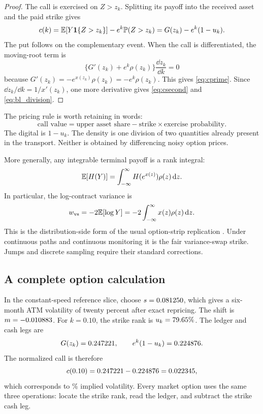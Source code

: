 \begin{proof}
The call is exercised on $Z>z_k$.  Splitting its payoff into the received
asset and the paid strike gives
\[
c(k)=\mathbb{E}[Y\mathbf{1}\{Z>z_k\}]-e^k\mathbb{P}(Z>z_k)
=G(z_k)-e^k(1-u_k).
\]
The put follows on the complementary event.  When the call is differentiated,
the moving-root term is
\[
\{G'(z_k)+e^k\rho(z_k)\}\frac{\dd z_k}{\dd k}=0
\]
because $G'(z_k)=-e^{x(z_k)}\rho(z_k)=-e^k\rho(z_k)$.  This gives
\eqref{eq:cprime}.  Since $\dd z_k/\dd k=1/x'(z_k)$, one more derivative
gives \eqref{eq:csecond} and \eqref{eq:bl_division}.
\end{proof}

The pricing rule is worth retaining in words:
\begin{equation}
\boxed{\quad\text{call value}=\text{upper asset share}
-\text{strike}\times\text{exercise probability}.\quad}
\label{eq:pricingwords}
\end{equation}
The digital is $1-u_k$.  The density is one division of two quantities
already present in the transport.  Neither is obtained by differencing noisy
option prices.

More generally, any integrable terminal payoff is a rank integral:
\begin{equation}
\mathbb{E}[H(Y)]=\int_{-\infty}^{\infty}H(e^{x(z)})\rho(z)\,\mathrm{d} z.
\label{eq:generalpayoff}
\end{equation}
In particular, the log-contract variance is
\begin{equation}
w_{\rm vs}=-2\mathbb{E}[\log Y]
=-2\int_{-\infty}^{\infty}x(z)\rho(z)\,\mathrm{d} z.
\label{eq:varswap}
\end{equation}
This is the distribution-side form of the usual option-strip replication
\citep{Neuberger1994,DemeterfiDermanKamalZou1999}.  Under continuous paths and
continuous monitoring it is the fair variance-swap strike.  Jumps and discrete
sampling require their standard corrections.

\subsection{A complete option calculation}

In the constant-speed reference slice, choose $s=0.081250$, which gives a
six-month ATM volatility of twenty percent after exact repricing.  The shift
is $m=-0.010883$.  For $k=0.10$, the strike rank is
$u_k=79.65\%$.  The ledger and cash legs are
\[
G(z_k)=0.247221,
\qquad e^k(1-u_k)=0.224876.
\]
The normalized call is therefore
\[
c(0.10)=0.247221-0.224876=0.022345,
\]
which corresponds to \MacToyIvOtmPct\% implied volatility.  Every market
option uses the same three operations: locate the strike rank, read the
ledger, and subtract the strike cash leg.

